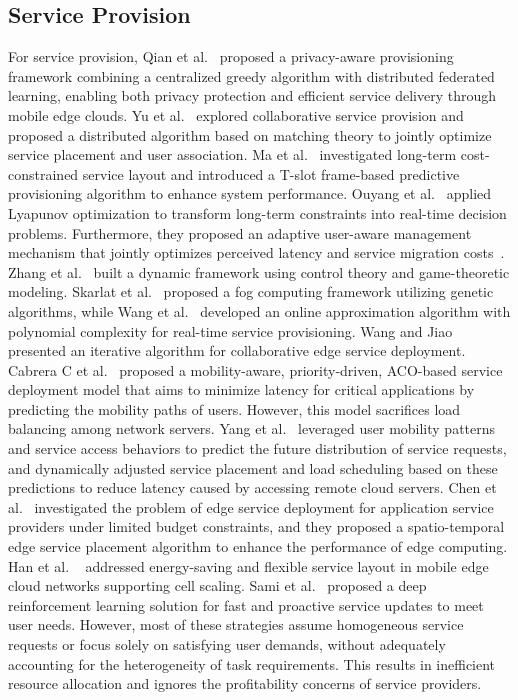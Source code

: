 \documentclass[10pt, conference, letterpaper]{IEEEtran}
\begin{document}
\subsection{Service Provision}
For service provision, Qian et al.~\cite{b14} proposed a privacy-aware provisioning framework combining a centralized greedy algorithm with distributed federated learning, enabling both privacy protection and efficient service delivery through mobile edge clouds. Yu et al.~\cite{b15} explored collaborative service provision and proposed a distributed algorithm based on matching theory to jointly optimize service placement and user association. Ma et al.~\cite{b16} investigated long-term cost-constrained service layout and introduced a T-slot frame-based predictive provisioning algorithm to enhance system performance. Ouyang et al.~\cite{b17} applied Lyapunov optimization to transform long-term constraints into real-time decision problems. Furthermore, they proposed an adaptive user-aware management mechanism that jointly optimizes perceived latency and service migration costs~\cite{b18}. Zhang et al.~\cite{b19} built a dynamic framework using control theory and game-theoretic modeling. Skarlat et al.~\cite{b20} proposed a fog computing framework utilizing genetic algorithms, while Wang et al.~\cite{b21} developed an online approximation algorithm with polynomial complexity for real-time service provisioning. Wang and Jiao~\cite{b22} presented an iterative algorithm for collaborative edge service deployment. Cabrera C et al.~\cite{b23} proposed a mobility-aware, priority-driven, ACO-based service deployment model that aims to minimize latency for critical applications by predicting the mobility paths of users. However, this model sacrifices load balancing among network servers. Yang et al.~\cite{b24} leveraged user mobility patterns and service access behaviors to predict the future distribution of service requests, and dynamically adjusted service placement and load scheduling based on these predictions to reduce latency caused by accessing remote cloud servers. Chen et al.~\cite{b25} investigated the problem of edge service deployment for application service providers under limited budget constraints, and they proposed a spatio-temporal edge service placement algorithm to enhance the performance of edge computing. Han et al. ~\cite{b26} addressed energy-saving and flexible service layout in mobile edge cloud networks supporting cell scaling. Sami et al.~\cite{b27} proposed a deep reinforcement learning solution for fast and proactive service updates to meet user needs. %
However, most of these strategies assume homogeneous service requests or focus solely on satisfying user demands, without adequately accounting for the heterogeneity of task requirements. This results in inefficient resource allocation and ignores the profitability concerns of service providers.
\end{document}
